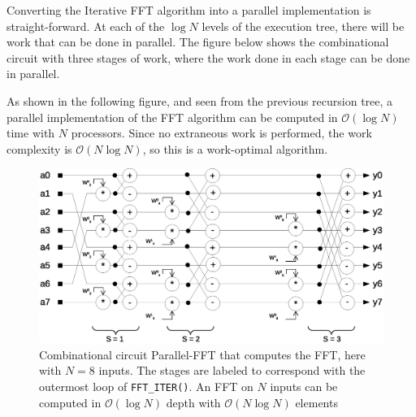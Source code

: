 Converting the Iterative FFT algorithm into a parallel implementation is straight-forward. At each of the $\log N$ levels of the execution tree, there will be work that can be done in parallel. The figure below shows the combinational circuit with three stages of work, where the work done in each stage can be done in parallel.

As shown in the following figure, and seen from the previous recursion tree, a parallel implementation of the FFT algorithm can be computed in $\mathcal{O}(\log N)$ time with $N$ processors. Since no extraneous work is performed, the work complexity is $\mathcal{O}(N\log N)$, so this is a work-optimal algorithm. 

\begin{figure}[h]
\center
\includegraphics[scale=0.45]{img/parallel_fft_circuit.eps}
\caption{Combinational circuit Parallel-FFT that computes the FFT, here with $N=8$ inputs. The stages are labeled to correspond with the outermost loop of \texttt{FFT\_ITER()}. An FFT on $N$ inputs can be computed in $\mathcal{O}(\log N)$ depth with $\mathcal{O}(N \log N)$ elements}
\end{figure}